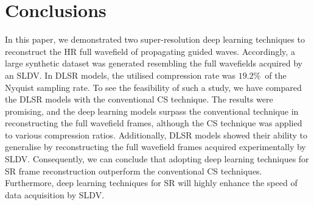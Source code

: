 \section{Conclusions}
\label{conclusion}
In this paper, we demonstrated two super-resolution deep learning techniques to reconstruct the HR full wavefield of propagating guided waves.
Accordingly, a large synthetic dataset was generated resembling the full wavefields acquired by an SLDV.
In DLSR models, the utilised compression rate was \(19.2\%\)\ of the Nyquist sampling rate.
To see the feasibility of such a study, we have compared the DLSR models with the conventional CS technique. 
The results were promising, and the deep learning models surpass the conventional technique in reconstructing the full wavefield frames, although the CS technique was applied to various compression ratios.
Additionally, DLSR models showed their ability to generalise by reconstructing the full wavefield frames acquired experimentally by SLDV.
Consequently, we can conclude that adopting deep learning techniques for SR frame reconstruction outperform the conventional CS techniques.
Furthermore, deep learning techniques for SR will highly enhance the speed of data acquisition by SLDV.

